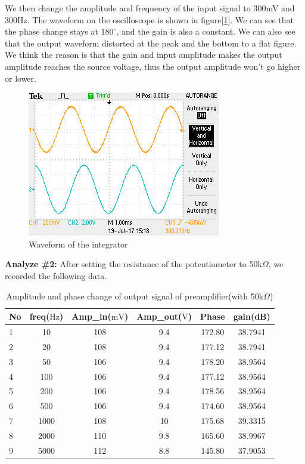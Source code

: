 \phantom{ } We then change the amplitude and frequency of the input signal to 300mV and 300Hz. The waveform on the oscilloscope is shown in figure[\ref{fig:103}]. We can see that the phase change stays at $ 180^{\circ} $, and the gain is also a constant. We can also see that the output waveform distorted at the peak and the bottom to a flat figure. We think the reason is that the gain and input amplitude makes the output amplitude reaches the source voltage, thus the output amplitude won't go higher or lower.\\
\begin{figure}[!htbp]
	\centering 
	\begin{framed}
		\includegraphics[width=\linewidth]{images/osc1.png}
		\caption{Waveform of the integrator}
		\label{fig:103} 
	\end{framed}
\end{figure} 
\hfill \newline
\textbf{Analyze \#2:} \newline
\phantom{ } After setting the resistance of the potentiometer to 50$ \si{\kilo\Omega} $, we recorded the following data.
\begin{table}[!htbp]
	\centering
	\caption{Amplitude and phase change of output signal of preamplifier(with 50$ \si{\kilo\Omega} $)}
	\begin{tabular}{lccccc}
		\toprule
		No &freq($\si{\hertz}$) &Amp\_in($\si{\milli\volt}$)&Amp\_out($\si{\volt}$)&Phase&gain(dB)\\
		\midrule
		1	&10		&108	&9.4	&172.80	&38.7941\\
		2	&20		&108	&9.4	&177.12	&38.7941\\
		3	&50		&106	&9.4	&178.20	&38.9564\\
		4	&100	&106	&9.4	&177.12	&38.9564\\
		5	&200	&106	&9.4	&178.56	&38.9564\\
		6	&500	&106	&9.4	&174.60	&38.9564\\
		7	&1000	&108	&10		&175.68	&39.3315\\
		8	&2000	&110	&9.8	&165.60	&38.9967\\
		9	&5000	&112	&8.8	&145.80	&37.9053\\
		\bottomrule
	\end{tabular}
	\label{tab:preamp50}
\end{table}

